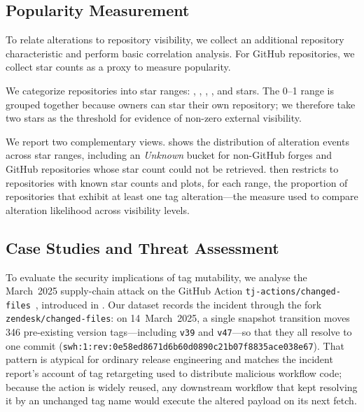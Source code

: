 \subsection{Popularity Measurement}
\label{subsec:tags-popularity-method}

To relate alterations to repository visibility, we collect an additional repository characteristic and perform basic correlation analysis.
For GitHub repositories, we collect star counts as a proxy to measure popularity.

We categorize repositories into star ranges: \StarRangeZeroOne, \StarRangeTwoTen, \StarRangeElevenHundred, \StarRangeHundredFiveHundred, and \StarRangeFiveHundredPlus stars.
The 0--1 range is grouped together because owners can star their own repository; we therefore take two stars as the threshold for evidence of non-zero external visibility.

We report two complementary views.
 shows the distribution of alteration events across star ranges, including an \emph{Unknown} bucket for non-GitHub forges and GitHub repositories whose star count could not be retrieved.
 then restricts to repositories with known star counts and plots, for each range, the proportion of repositories that exhibit at least one tag alteration---the measure used to compare alteration likelihood across visibility levels.

\subsection{Case Studies and Threat Assessment}
\label{subsec:tags-casestudy-method}

To evaluate the security implications of tag mutability, we analyse the March~2025 supply-chain attack on the GitHub Action \texttt{tj-actions/changed-files}~\cite{paloalto_unit42_2025}, introduced in .
Our dataset records the incident through the fork \texttt{zendesk/changed-files}: on 14~March~2025, a single snapshot transition moves \num{346} pre-existing version tags---including \texttt{v39} and \texttt{v47}---so that they all resolve to one commit (\texttt{swh:1:rev:0e58ed8671d6b60d0890c21b07f8835ace038e67}).
That pattern is atypical for ordinary release engineering and matches the incident report's account of tag retargeting used to distribute malicious workflow code; because the action is widely reused, any downstream workflow that kept resolving it by an unchanged tag name would execute the altered payload on its next fetch.

